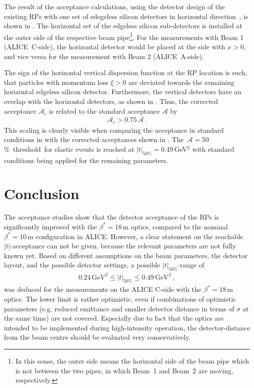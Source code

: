 The result of the acceptance calculations, using the detector design of the existing RPs with  one set of edegeless silicon detectors in horizontal direction~\cite{LHCAcceleratorExperiments}, is shown in . The horizontal set of the edgeless silicon sub-detectors is installed at the outer side of the respective beam pipe\footnote{In this sense, the outer side  means the horizontal side of the beam pipe which is not between the two pipes, in which \mbox{Beam 1} and \mbox{Beam 2} are moving, respectively.}. For the measurements with Beam 1 \mbox{(ALICE C-side)}, the horizontal detector would be placed at the side with $x>0$, and vice versa for the measurement with Beam 2 \mbox{(ALICE A-side)}.

The sign of the horizontal vertical dispersion function at the RP location is such, that particles with momentum loss $\xi>0$ are deviated towards the remaining horizontal edgeless silicon detector. Furthermore, the vertical detectors have an overlap with the horizontal detectors, as shown in . Thus, the corrected acceptance $\mathcal{A}_c$ is related to the standard acceptance $\mathcal{A}$ by
\begin{align}
\mathcal{A}_c > 0.75\,\mathcal{A} \, .
\end{align}
This scaling is clearly visible when comparing the acceptance in standard conditions in  with the corrected acceptances shown in .  \mbox{The $\mathcal{A}=$50$\,$\% threshold for} elastic events is reached at $|t|_{50\%}=0.49\,$GeV$^2$ with standard conditions being applied for the remaining parameters.

\newpage
\section{Conclusion}
The acceptance studies show that the detector acceptance of the RPs is significantly improved with the \mbox{$\beta^*=18\,$m} optics, compared to the nominal $\beta^*=10\,$m configuration in ALICE. \mbox{However}, a clear statement on the reachable $|t|$-acceptance can not be given, because the relevant parameters are not fully known yet. Based on different assumptions on the beam parameters, the detector layout, and the possible detector settings, a possible $|t|_{50\%}$-range of
\begin{align}
0.24 \, \text{GeV}^2 \leq |t|_{\text{50}\%} \leq 0.49 \, \text{GeV}^2 \, ,
\end{align}
was deduced for the measurements on the ALICE C-side with the $\beta^*=18\,$m optics. The lower limit is rather optimistic, even if combinations of optimistic parameters (e.g. reduced emittance and smaller detector distance in terms of $\sigma$ at the same time) are not covered. Especially due to fact that the optics are intended to be implemented during high-intensity operation, the detector-distance from the beam centre should be evaluated very conservatively.  

